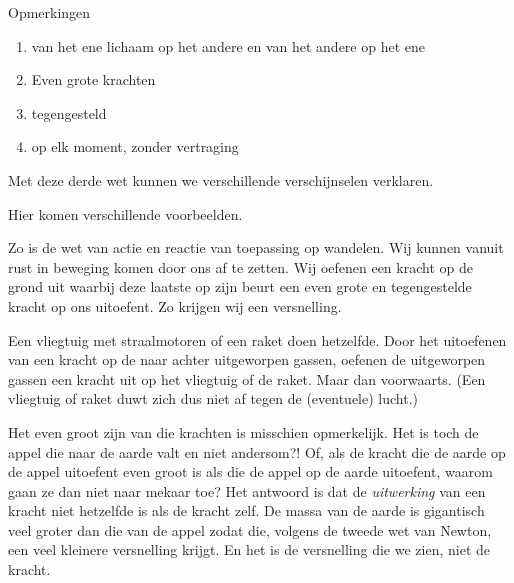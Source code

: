 \documentclass{ximera}
\begin{document}
	Opmerkingen %
	
	\begin{enumerate}
		\item van het ene lichaam op het andere en van het andere op het ene	
		\item Even grote krachten
		\item tegengesteld
		\item op elk moment, zonder vertraging
	\end{enumerate}
	
	Met deze derde wet kunnen we verschillende verschijnselen verklaren. 
	
	Hier komen verschillende voorbeelden.
	
	Zo is de wet van actie en reactie van toepassing op wandelen. Wij kunnen vanuit rust in beweging komen door ons af te zetten. Wij oefenen een kracht op de grond uit waarbij deze laatste op zijn beurt een even grote en tegengestelde kracht op ons uitoefent. Zo krijgen wij een versnelling. 
	
	Een vliegtuig met straalmotoren of een raket doen hetzelfde. Door het uitoefenen van een kracht op de naar achter uitgeworpen gassen, oefenen de uitgeworpen gassen een kracht uit op het vliegtuig of de raket. Maar dan voorwaarts. (Een vliegtuig of raket duwt zich dus niet af tegen de (eventuele) lucht.)
	
	Het even groot zijn van die krachten is misschien opmerkelijk. Het is toch de appel die naar de aarde valt en niet andersom?! Of, als de kracht die de aarde op de appel uitoefent even groot is als die de appel op de aarde uitoefent, waarom gaan ze dan niet naar mekaar toe? Het antwoord is dat de \emph{uitwerking} van een kracht niet hetzelfde is als de kracht zelf. De massa van de aarde is gigantisch veel groter dan die van de appel zodat die, volgens de tweede wet van Newton, een veel kleinere versnelling krijgt. En het is de versnelling die we zien, niet de kracht.
	
	
\end{document}
